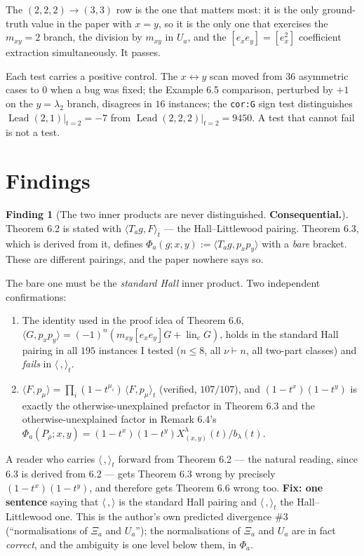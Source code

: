 \documentclass[11pt]{article}
\theoremstyle{definition}
\newtheorem{finding}{Finding}
\newcommand{\Lead}{\operatorname{Lead}}
\begin{document}
The $(2,2,2)\to(3,3)$ row is the one that matters most: it is the only ground-truth value in
the paper with $x=y$, so it is the only one that exercises the $m_{xy}=2$ branch, the division
by $m_{xy}$ in $U_a$, and the $[e_x e_y]=[e_x^2]$ coefficient extraction simultaneously. It
passes.

Each test carries a positive control. The $x\leftrightarrow y$ scan moved from $36$
asymmetric cases to $0$ when a bug was fixed; the Example 6.5 comparison, perturbed by $+1$ on
the $y=\lambda_2$ branch, disagrees in $16$ instances; the \texttt{cor:G} sign test
distinguishes $\Lead(2,1)|_{t=2}=-7$ from $\Lead(2,2,2)|_{t=2}=9450$. A test that cannot fail
is not a test.

\section{Findings}

\begin{finding}[The two inner products are never distinguished. \textbf{Consequential.}]
Theorem 6.2 is stated with $\langle T_ag,F\rangle_t$ --- the Hall--Littlewood pairing.
Theorem 6.3, which is derived from it, defines
$\Phi_a(g;x,y):=\langle T_ag,p_xp_y\rangle$ with a \emph{bare} bracket. These are different
pairings, and the paper nowhere says so.

The bare one must be the \emph{standard Hall} inner product. Two independent confirmations:
\begin{enumerate}
\item The identity used in the proof idea of Theorem 6.6,
$\langle G,p_xp_y\rangle=(-1)^n\!\left(m_{xy}[e_xe_y]G+\operatorname{lin}_e G\right)$,
holds in the standard Hall pairing in all $195$ instances I tested
($n\le 8$, all $\nu\vdash n$, all two-part classes) and \emph{fails} in
$\langle\,,\rangle_t$.
\item $\langle F,p_\mu\rangle=\prod_i(1-t^{\mu_i})\,\langle F,p_\mu\rangle_t$ (verified,
$107/107$), and $(1-t^x)(1-t^y)$ is exactly the otherwise-unexplained prefactor in
Theorem 6.3 and the otherwise-unexplained factor in Remark 6.4's
$\Phi_a(P_\rho;x,y)=(1-t^x)(1-t^y)X^\lambda_{(x,y)}(t)/b_\lambda(t)$.
\end{enumerate}
A reader who carries $\langle\,,\rangle_t$ forward from Theorem 6.2 --- the natural reading,
since 6.3 is derived from 6.2 --- gets Theorem 6.3 wrong by precisely $(1-t^x)(1-t^y)$, and
therefore gets Theorem 6.6 wrong too. \textbf{Fix: one sentence} saying that $\langle\,,\rangle$
is the standard Hall pairing and $\langle\,,\rangle_t$ the Hall--Littlewood one. This is the
author's own predicted divergence \#3 (``normalisations of $\Xi_a$ and $U_a$''); the
normalisations of $\Xi_a$ and $U_a$ are in fact \emph{correct}, and the ambiguity is one level
below them, in $\Phi_a$.
\end{finding}
\end{document}
